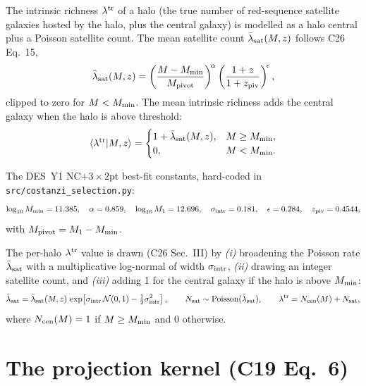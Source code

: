 \documentclass[a4paper, 11pt]{article}
\newcommand{\ltr}{\lambda^{\rm tr}}
\newcommand{\pyfile}[1]{{\small\texttt{#1}}}
\begin{document}
The intrinsic richness $\ltr$ of a halo (the true number of red-sequence
satellite galaxies hosted by the halo, plus the central galaxy) is
modelled as a halo central plus a Poisson satellite count. The mean
satellite count $\bar\lambda_{\rm sat}(M, z)$ follows C26 Eq.~15,
\begin{equation}
\label{eq:lsat}
  \bar\lambda_{\rm sat}(M, z)
  = \left( \frac{M - M_{\rm min}}{M_{\rm pivot}} \right)^{\!\alpha}
        \left( \frac{1+z}{1+z_{\rm piv}} \right)^{\!\epsilon},
\end{equation}
clipped to zero for $M < M_{\rm min}$. The mean intrinsic richness adds
the central galaxy when the halo is above threshold:
\begin{equation}
  \label{eq:ltr-mean}
  \langle\ltr | M, z\rangle =
  \begin{cases}
    1 + \bar\lambda_{\rm sat}(M, z), & M \ge M_{\rm min}, \\
    0,                                & M < M_{\rm min}.
  \end{cases}
\end{equation}

The DES~Y1 NC$+3{\times}2$pt best-fit constants, hard-coded in
\pyfile{src/costanzi\_selection.py}:
\begin{equation*}
  \log_{10} M_{\rm min} = 11.385,\quad
  \alpha = 0.859,\quad
  \log_{10} M_1 = 12.696,\quad
  \sigma_{\rm intr} = 0.181,\quad
  \epsilon = 0.284,\quad
  z_{\rm piv} = 0.4544,
\end{equation*}
with $M_{\rm pivot} = M_1 - M_{\rm min}$.

The per-halo $\ltr$ value is drawn (C26 Sec.~III) by
\textit{(i)} broadening the Poisson rate $\bar\lambda_{\rm sat}$ with a
multiplicative log-normal of width $\sigma_{\rm intr}$,
\textit{(ii)} drawing an integer satellite count, and
\textit{(iii)} adding 1 for the central galaxy if the halo is above
$M_{\rm min}$:
\begin{equation*}
  \tilde\lambda_{\rm sat} = \bar\lambda_{\rm sat}(M, z)\,
    \exp\!\left[\sigma_{\rm intr}\,\mathcal N(0, 1)
    - \tfrac{1}{2}\sigma_{\rm intr}^2\right],\qquad
  N_{\rm sat} \sim \mathrm{Poisson}(\tilde\lambda_{\rm sat}),\qquad
  \ltr = N_{\rm cen}(M) + N_{\rm sat},
\end{equation*}
where $N_{\rm cen}(M) = 1$ if $M \ge M_{\rm min}$ and $0$ otherwise.

\section{The projection kernel (C19 Eq.~6)}
\label{sec:projection}
\end{document}
